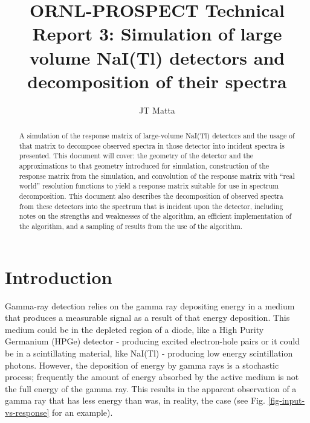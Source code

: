\documentclass[5p]{elsarticle}
\begin{document}
\title{ORNL-PROSPECT Technical Report 3: Simulation of large volume NaI(Tl) detectors and decomposition of their spectra}
\author{JT Matta}
\address{Oak Ridge National Laboratory, Oak Ridge, TN 37831, USA}
\begin{abstract}
A simulation of the response matrix of large-volume NaI(Tl) detectors and the usage of that matrix to decompose observed spectra in those detector into incident spectra is presented. This document will cover: the geometry of the detector and the approximations to that geometry introduced for simulation, construction of the response matrix from the simulation, and convolution of the response matrix with ``real world'' resolution functions to yield a response matrix suitable for use in spectrum decomposition. This document also describes the decomposition of observed spectra from these detectors into the spectrum that is incident upon the detector, including notes on the strengths and weaknesses of the algorithm, an efficient implementation of the algorithm, and a sampling of results from the use of the algorithm.
\end{abstract}

\maketitle
\section{Introduction}

Gamma-ray detection relies on the gamma ray depositing energy in a medium that produces a measurable signal as a result of that energy deposition. This medium could be in the depleted region of a diode, like a High Purity Germanium (HPGe) detector - producing excited electron-hole pairs or it could be in a scintillating material, like NaI(Tl) - producing low energy scintillation photons. However, the deposition of energy by gamma rays is a stochastic process; frequently the amount of energy absorbed by the active medium is not the full energy of the gamma ray. This results in the apparent observation of a gamma ray that has less energy than was, in reality, the case (see Fig. \ref{fig-input-vs-response} for an example).
\end{document}
